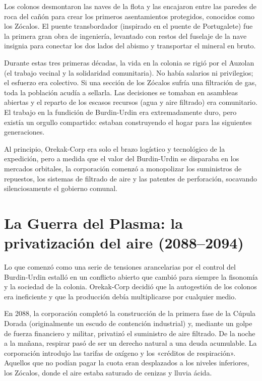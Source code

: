  Los colonos desmontaron las naves de la flota y las encajaron entre las paredes de roca del cañón para crear los primeros asentamientos protegidos, conocidos como los Zócalos. El puente transbordador (inspirado en el puente de Portugalete) fue la primera gran obra de ingeniería, levantado con restos del fuselaje de la nave insignia para conectar los dos lados del abismo y transportar el mineral en bruto.

 Durante estas tres primeras décadas, la vida en la colonia se rigió por el Auzolan (el trabajo vecinal y la solidaridad comunitaria). No había salarios ni privilegios; el esfuerzo era colectivo. Si una sección de los Zócalos sufría una filtración de gas, toda la población acudía a sellarla. Las decisiones se tomaban en asambleas abiertas y el reparto de los escasos recursos (agua y aire filtrado) era comunitario. El trabajo en la fundición de Burdin-Urdin era extremadamente duro, pero existía un orgullo compartido: estaban construyendo el hogar para las siguientes generaciones.

 Al principio, Orekak-Corp era solo el brazo logístico y tecnológico de la expedición, pero a medida que el valor del Burdin-Urdin se disparaba en los mercados orbitales, la corporación comenzó a monopolizar los suministros de repuestos, los sistemas de filtrado de aire y las patentes de perforación, socavando silenciosamente el gobierno comunal.

\section{La Guerra del Plasma: la privatización del aire (2088--2094)}

Lo que comenzó como una serie de tensiones arancelarias por el control del Burdin-Urdin estalló en un conflicto abierto que cambió para siempre la fisonomía y la sociedad de la colonia. Orekak-Corp decidió que la autogestión de los colonos era ineficiente y que la producción debía multiplicarse por cualquier medio.

 En 2088, la corporación completó la construcción de la primera fase de la Cúpula Dorada (originalmente un escudo de contención industrial) y, mediante un golpe de fuerza financiero y militar, privatizó el suministro de aire filtrado. De la noche a la mañana, respirar pasó de ser un derecho natural a una deuda acumulable. La corporación introdujo las tarifas de oxígeno y los «créditos de respiración». Aquellos que no podían pagar la cuota eran desplazados a los niveles inferiores, los Zócalos, donde el aire estaba saturado de cenizas y lluvia ácida.

